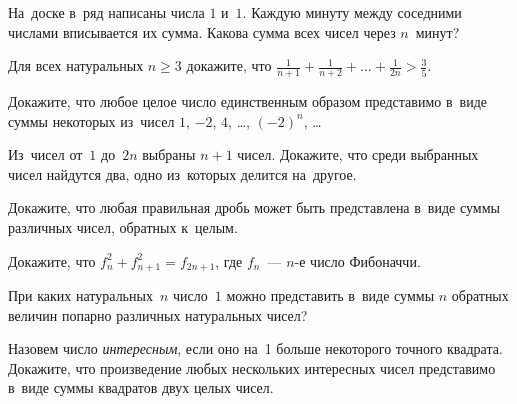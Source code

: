 


\begin{problems}

\item
На~доске в~ряд написаны числа $1$ и~$1$.
Каждую минуту между соседними числами вписывается их сумма.
Какова сумма всех чисел через $n$~минут?

\item
Для всех натуральных $n \geq 3$ докажите, что
\(
    \frac{1}{n + 1} + \frac{1}{n + 2} + \ldots + \frac{1}{2 n}
>
    \frac{3}{5}
\).

\item
Докажите, что любое целое число единственным образом представимо в~виде суммы
некоторых из~чисел $1$, $-2$, $4$, \ldots, $(-2)^n$, \ldots

\item
Из~чисел от~$1$ до~$2 n$ выбраны $n + 1$ чисел.
Докажите, что среди выбранных чисел найдутся два, одно из~которых делится
на~другое.

\item
Докажите, что любая правильная дробь может быть представлена в~виде суммы
различных чисел, обратных к~целым.

\item
Докажите, что $f_{n}^2 + f_{n+1}^2 = f_{2n+1}$, где $f_{n}$~--- $n$-е число
Фибоначчи.

\item
При каких натуральных~$n$ число~$1$ можно представить в~виде суммы $n$ обратных
величин попарно различных натуральных чисел?

\item
Назовем число \emph{интересным}, если оно на~1 больше некоторого точного
квадрата.
Докажите, что произведение любых нескольких интересных чисел представимо в~виде
суммы квадратов двух целых чисел.




\end{problems}
